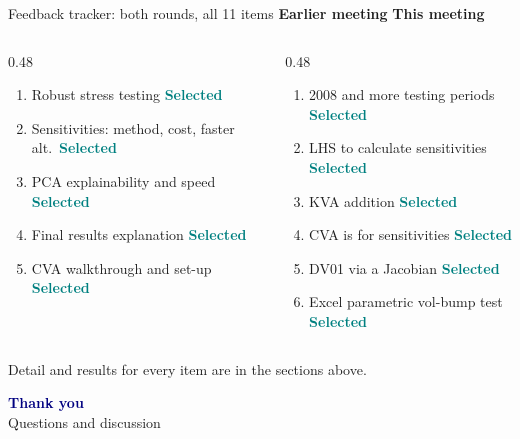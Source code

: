 \documentclass[8pt,aspectratio=169]{beamer}
\newcommand{\good}{\textcolor{teal}{\textbf{Selected}}}
\begin{document}
\begin{frame}{Feedback tracker: both rounds, all 11 items}
  \scriptsize
  \textbf{Earlier meeting} \hfill \textbf{This meeting}
  \begin{columns}[T]
    \begin{column}{0.48\textwidth}
      \begin{enumerate}
        \item Robust stress testing \good
        \item Sensitivities: method, cost, faster alt.\ \good
        \item PCA explainability and speed \good
        \item Final results explanation \good
        \item CVA walkthrough and set-up \good
      \end{enumerate}
    \end{column}
    \begin{column}{0.48\textwidth}
      \begin{enumerate}
        \item[6.] 2008 and more testing periods \good
        \item[7.] LHS to calculate sensitivities \good
        \item[8.] KVA addition \good
        \item[9.] CVA is for sensitivities \good
        \item[10.] DV01 via a Jacobian \good
        \item[11.] Excel parametric vol-bump test \good
      \end{enumerate}
    \end{column}
  \end{columns}
  \vspace{6pt}
  \centering\small Detail and results for every item are in the sections above.
\end{frame}

\begin{frame}
  \centering
  \vspace{2cm}
  {\Huge \textcolor{navy}{\textbf{Thank you}}}\\[8pt]
  {\large Questions and discussion}
\end{frame}
\end{document}
